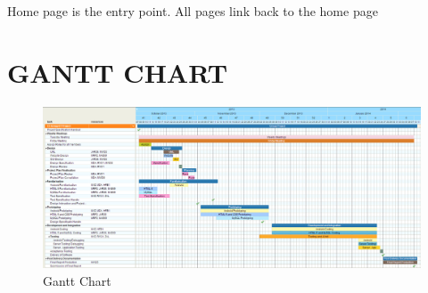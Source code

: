 \documentclass[12pt]{article}
\begin{document}
\par{Home page is the entry point. All pages link back to the home page}
\newpage
\section{GANTT CHART}
\begin{landscape}
	\begin{figure}[htp]
	\begin{adjustwidth}{-0.7cm}{0cm}
\centering
\includegraphics[scale=0.58]{Project_Plan/docs/gant_chart_01.PNG}
\caption{Gantt Chart}
\label{Gantt Chart}
\end{adjustwidth}
\end{figure}
\end{landscape}
\restoregeometry
\newpage
\end{document}
